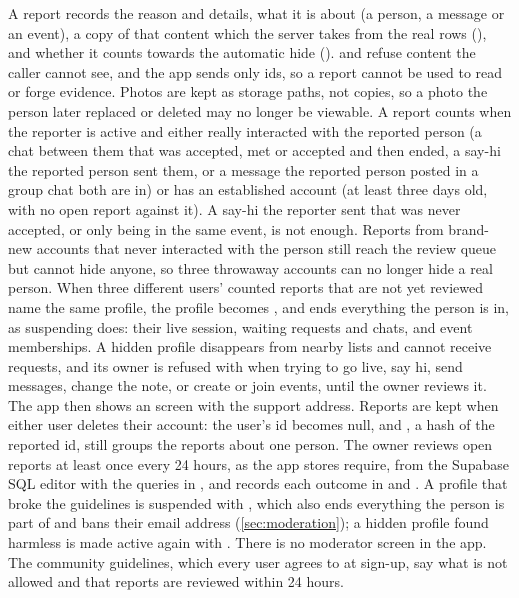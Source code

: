 A report records the reason and details, what it is about (a person, a message or an event), a copy of
that content which the server takes from the real rows (), and whether it counts towards
the automatic hide ().  and  refuse
content the caller cannot see, and the app sends only ids, so a report cannot be used to read or forge
evidence. Photos are kept as storage paths, not copies, so a photo the person later replaced or deleted
may no longer be viewable. A report counts when the reporter is active and either really interacted
with the reported person (a chat between them that was accepted, met or accepted and then ended, a
say-hi the reported person
sent them, or a message the reported person posted in a group chat both are in) or has an established
account (at least three days old, with no open report against it). A say-hi the reporter sent that was
never accepted, or only being in the same event, is not enough. Reports from brand-new accounts that
never interacted with the person still reach the review queue but cannot hide anyone, so three throwaway
accounts can no longer hide a real person. When three different users' counted reports that are not yet
reviewed name the same profile, the profile becomes , and  ends
everything the person is in, as suspending does: their live session, waiting requests and chats, and
event memberships. A hidden profile disappears from nearby lists and cannot receive requests, and its owner is
refused with  when trying to go live, say hi, send messages, change the note, or
create or join events, until the owner reviews it. The app then shows an  screen with
the support address. Reports are kept when either user deletes their account: the user's id becomes
null, and , a hash of the reported id, still groups the reports about one person. The owner reviews open reports at
least once every 24 hours, as the app stores require, from the Supabase SQL editor with the queries in
, and records each outcome in  and . A
profile that broke the guidelines is suspended with , which also ends
everything the person is part of and bans their email address (\cref{sec:moderation}); a hidden profile
found harmless is made active again with . There is no moderator screen in the app. The community guidelines, which every user agrees
to at sign-up, say what is not allowed and that reports are reviewed within 24 hours.

